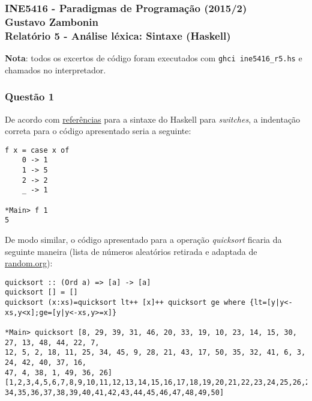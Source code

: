 \documentclass{article}
\begin{document}
\subsubsection*{INE5416 - Paradigmas de Programação (2015/2) \\
    Gustavo Zambonin \\
    Relatório 5 - Análise léxica: Sintaxe (Haskell)
}

\textbf{Nota}: todos os excertos de código foram executados com
\texttt{ghci ine5416\_r5.hs} e chamados no interpretador.

\subsubsection*{Questão 1}
De acordo com
\href{http://rigaux.org/language-study/syntax-across-languages/CntrFlow.html}
{referências} para a sintaxe do Haskell para \textit{switches}, a indentação
correta para o código apresentado seria a seguinte:
\begin{verbatim}
f x = case x of
    0 -> 1
    1 -> 5
    2 -> 2
    _ -> 1

*Main> f 1
5 \end{verbatim}
De modo similar, o código apresentado para a operação \textit{quicksort}
ficaria da seguinte maneira (lista de números aleatórios retirada e adaptada
de \href{https://random.org/integer-sets/?sets=1&num=50&min=1&max=50&commas=on&order=index&format=plain}
{random.org}):
\begin{verbatim}
quicksort :: (Ord a) => [a] -> [a]
quicksort [] = []
quicksort (x:xs)=quicksort lt++ [x]++ quicksort ge where {lt=[y|y<-xs,y<x];ge=[y|y<-xs,y>=x]}

*Main> quicksort [8, 29, 39, 31, 46, 20, 33, 19, 10, 23, 14, 15, 30, 27, 13, 48, 44, 22, 7,
12, 5, 2, 18, 11, 25, 34, 45, 9, 28, 21, 43, 17, 50, 35, 32, 41, 6, 3, 24, 42, 40, 37, 16,
47, 4, 38, 1, 49, 36, 26]
[1,2,3,4,5,6,7,8,9,10,11,12,13,14,15,16,17,18,19,20,21,22,23,24,25,26,27,28,29,30,31,32,33,
34,35,36,37,38,39,40,41,42,43,44,45,46,47,48,49,50] \end{verbatim}
\end{document}
